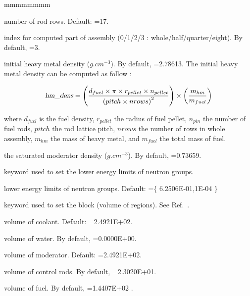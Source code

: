 \begin{ListeDeDescription}{mmmmmmmm}
\item[\dusa{nrows}] number of rod rows. Default: =17.

\item[\dusa{part}] index for computed part of assembly (0/1/2/3 : whole/half/quarter/eight). By
default, =3.

\item[\dusa{hm$\_$dens}] initial heavy metal density ($g.cm^{-3}$). By
default, =2.78613. The initial heavy metal density can be computed as follow :

$$
\dusa{hm$\_$dens}=\left( d_{fuel}\times \pi \times r_{pellet} \times n_{pellet} \over \left( pitch \times nrows \right)^{2} \right) \times \left( m_{hm} \over m_{fuel }\right)
$$

where $d_{fuel}$ is the fuel density, $r_{pellet}$ the radius of fuel pellet, $n_{pin}$ the number of fuel rods, $pitch$ the rod lattice pitch, $nrows$ the number of rows in whole assembly,  $m_{hm}$ the mass of heavy metal, and $m_{fuel}$ the total mass of fuel.

\item[\dusa{bypass}] the saturated moderator density ($g.cm^{-3}$). By
default, =0.73659.

\item[\moc{FILE$\_$CONT$\_$2}]  keyword used to set the lower energy limits of neutron groups.

\item[\dusa{emin}] lower energy limits of neutron groups. Default: =$\lbrace$ 6.2506E-01,1E-04 $\rbrace$

\item[\moc{FILE$\_$CONT$\_$3}]  keyword used to set the  block (volume of regions). See Ref.~.
\item[\dusa{vcool}] volume of coolant. Default: =2.4921E+02.

\item[\dusa{vwatr}] volume of water. By
default, =0.0000E+00.

\item[\dusa{vmodr}] volume of moderator. Default: =2.4921E+02.

\item[\dusa{vcnrd}] volume of control rods. By
default, =2.3020E+01.

\item[\dusa{vfuel}] volume of fuel. By
default, =1.4407E+02 .


\end{ListeDeDescription}
